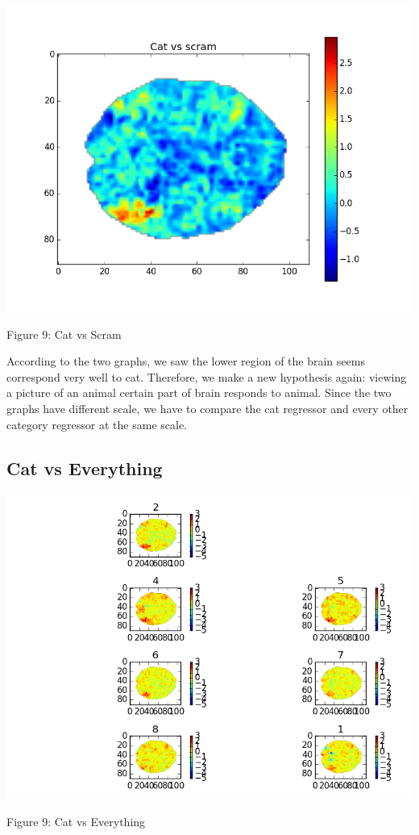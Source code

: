 \documentclass[12pt]{article}
\begin{document}
\begin{housevseverything}
\begin{housevseverything}
\begin{housevseverything}
    \centering
      \includegraphics{cat_vs_scram}
    \caption{Figure 9: Cat vs Scram}


According to the two graphs, we saw the lower region of the brain seems correspond very well to cat. Therefore, we make a new hypothesis again:  viewing a picture of an animal certain part of brain responds to animal. Since the two graphs have different scale, we have to compare the cat regressor and every other category regressor at the same scale.


\end{housevseverything}


\subsection{Cat vs Everything}

\begin{housevseverything}
    \centering
      \includegraphics[width=.8\textwidth]{cat_everything}
    \caption{Figure 9: Cat vs Everything}



\end{housevseverything}
\end{housevseverything}
\end{housevseverything}
\end{document}
